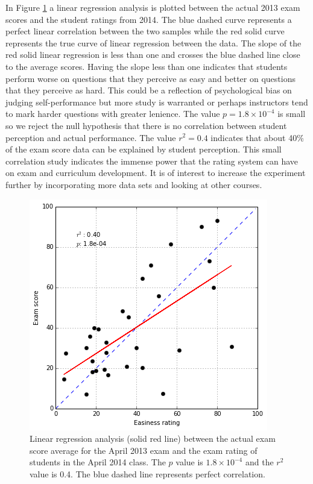 \documentclass{primus}
\begin{document}
\noindent{}In Figure \ref{fig:lin_reg} a linear regression analysis is plotted between the actual 2013 exam scores and the student ratings from 2014. The blue dashed curve represents a perfect linear correlation between the two samples while the red solid curve represents the true curve of linear regression between the data. The slope of the red solid linear regression is less than one and crosses the blue dashed line close to the average scores. Having the slope less than one indicates that students perform worse on questions that they perceive as easy and better on questions that they perceive as hard. This could be a reflection of psychological bias on judging self-performance but more study is warranted or perhaps instructors tend to mark harder questions with greater lenience. The value $p=1.8\times 10^{-4}$ is small so we reject the null hypothesis that there is no correlation between student perception and actual performance. The value $r^2=0.4$ indicates that about 40\% of the exam score data can be explained by student perception. This small correlation study indicates the immense power that the rating system can have on exam and curriculum development. It is of interest to increase the experiment further by incorporating more data sets and looking at other courses.

\begin{figure}[H]
\centering
\includegraphics[width=\textwidth]{figs/lin_reg.png}
\caption{Linear regression analysis (solid red line) between the actual exam score average for the April 2013 exam and the exam rating of students in the April 2014 class. The $p$ value is $1.8\times 10^{-4}$ and the $r^2$ value is 0.4. The blue dashed line represents perfect correlation.}\label{fig:lin_reg}
\end{figure}
\end{document}
